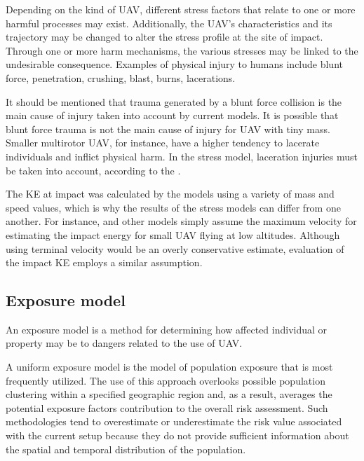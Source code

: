 \documentclass[12pt]{report}
\begin{document}
            Depending on the kind of UAV, different stress factors that relate to one or more harmful processes may
            exist. Additionally, the UAV's characteristics and its trajectory may be changed to alter the stress profile
            at the site of impact. Through one or more harm mechanisms, the various stresses may be linked to the
            undesirable consequence. Examples of physical injury to humans include blunt force, penetration, crushing,
            blast, burns, lacerations.

            It should be mentioned that trauma generated by a blunt force collision is the main cause of injury taken
            into account by current models. It is possible that blunt force trauma is not the main cause of injury for
            UAV with tiny mass. Smaller multirotor UAV, for instance, have a higher tendency to lacerate individuals and
            inflict physical harm. In the stress model, laceration injuries must be taken into account, according to the
            \cite{small_aviation_2009}.

            The KE at impact was calculated by the models using a variety of mass and speed values, which is why the
            results of the stress models can differ from one another. For instance, \cite{ancel_real-time_2017} and
            other models simply assume the maximum velocity for estimating the impact energy for small UAV flying at low
            altitudes. Although using terminal velocity would be an overly conservative estimate, \cite{dalamagkidis_evaluating_2008} evaluation of the
            impact KE employs a similar assumption.

        \subsection{Exposure model}
            An exposure model is a method for determining how affected individual or property may be to dangers related
            to the use of UAV.

            A uniform exposure model is the model of population exposure that is most frequently utilized. The use of
            this approach overlooks possible population clustering within a specified geographic region and, as a
            result, averages the potential exposure factors contribution to the overall risk assessment. Such
            methodologies tend to overestimate or underestimate the risk value associated with the current setup because
            they do not provide sufficient information about the spatial and temporal distribution of the population.
\end{document}
